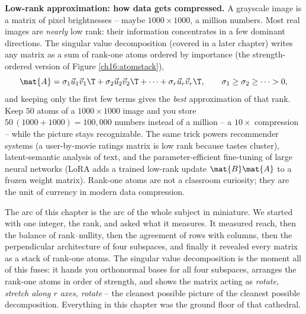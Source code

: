 \begin{applicationbox}
\textbf{Low-rank approximation: how data gets compressed.} A grayscale image is a
matrix of pixel brightnesses -- maybe $1000\times 1000$, a million numbers. Most
real images are \emph{nearly} low rank: their information concentrates in a few
dominant directions. The singular value decomposition (covered in a later
chapter) writes any matrix as a sum of rank-one atoms ordered by importance
(the strength-ordered version of Figure \ref{ch16:atomstack}),
\[
  \mat{A} = \sigma_1 \vec{u}_1\vec{v}_1\T + \sigma_2 \vec{u}_2\vec{v}_2\T
          + \cdots + \sigma_r \vec{u}_r\vec{v}_r\T,
  \qquad \sigma_1 \ge \sigma_2 \ge \cdots > 0,
\]
and keeping only the first few terms gives the \emph{best} approximation of that
rank. Keep $50$ atoms of a $1000\times 1000$ image and you store
$50\,(1000+1000)=100{,}000$ numbers instead of a million -- a $10\times$
compression -- while the picture stays recognizable. The same trick powers
recommender systems (a user-by-movie ratings matrix is low rank because tastes
cluster), latent-semantic analysis of text, and the parameter-efficient
fine-tuning of large neural networks (LoRA adds a trained low-rank update
$\mat{B}\mat{A}$ to a frozen weight matrix). Rank-one atoms are not a classroom
curiosity; they are the unit of currency in modern data compression.
\end{applicationbox}

\begin{aestheticbox}
The arc of this chapter is the arc of the whole subject in miniature. We started
with one integer, the rank, and asked what it measures. It measured reach, then
the balance of rank--nullity, then the agreement of rows with columns, then the
perpendicular architecture of four subspaces, and finally it revealed every
matrix as a stack of rank-one atoms. The singular value decomposition is the
moment all of this fuses: it hands you orthonormal bases for all four subspaces,
arranges the rank-one atoms in order of strength, and shows the matrix acting as
\emph{rotate, stretch along $r$ axes, rotate} -- the cleanest possible picture of
the cleanest possible decomposition. Everything in this chapter was the ground
floor of that cathedral.
\end{aestheticbox}

